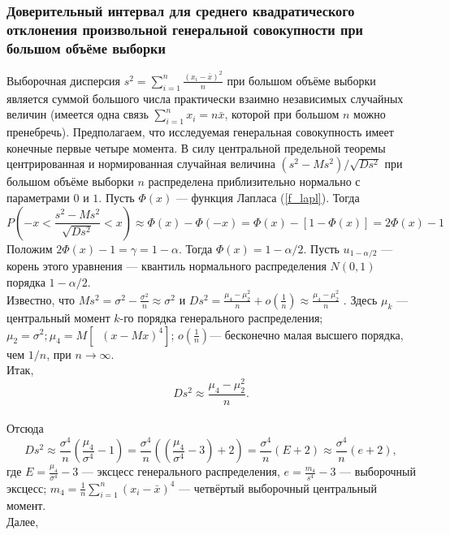 \documentclass[../body.tex]{subfiles}
\begin{document}
	\subsubsection{Доверительный интервал для среднего квадратического отклонения произвольной генеральной совокупности при большом объёме выборки}
	Выборочная дисперсия $s^{2} = \sum_{i = 1}^{n}{\frac{(x_{i} - \bar{x})^{2}}{n}}$ при большом объёме выборки является суммой большого числа практически взаимно независимых случайных величин (имеется одна связь $\sum_{i=1}^{n}{x_{i}} = n\bar{x}$, которой при большом $n$ можно пренебречь). Предполагаем, что исследуемая генеральная совокупность имеет конечные первые четыре момента.
	\newline
	В силу центральной предельной теоремы центрированная и нормированная случайная величина $(s^{2}-Ms^{2})/\sqrt{Ds^{2}}$ при большом объёме выборки $n$ распределена приблизительно нормально с параметрами $0$ и $1$. Пусть $\Phi(x)$ — функция Лапласа (\ref{f_lapl}). Тогда
	\begin{equation}
		P\left(-x < \frac{s^{2}-Ms^{2}}{\sqrt{Ds^{2}}} < x\right)
		\approx \Phi(x) - \Phi(-x)=\Phi(x) - [1 - \Phi(x)] = 2\Phi(x) - 1
		\label{P_as_sigma}
	\end{equation}
	Положим $2\Phi(x)-1 = \gamma = 1-\alpha$. Тогда $\Phi(x) = 1-\alpha/2$. Пусть $u_{1-\alpha/2}$ — корень этого уравнения — квантиль нормального распределения $N(0,1)$ порядка $1-\alpha/2$.\\ Известно, что $Ms^{2} = \sigma^{2} -\frac{\sigma^{2}}{n} \approx \sigma^{2} \text{ и } Ds^{2} = \frac{\mu_{4} -\mu_{2}^{2}}{n} + o(\frac{1}{n}) \approx \frac{\mu_{4} -\mu_{2}^{2}}{n}$ . Здесь $\mu_{k}$ — центральный момент $k$-го порядка генерального распределения; $\mu_{2} = \sigma^{2}; \mu_{4} = M[︀(x-Mx)^{4}]$︀; $o(\frac{1}{n})$︂— бесконечно малая высшего порядка, чем $1/n$, при $n\rightarrow \infty$. \\Итак, $$Ds^{2} \approx \frac{\mu_{4} -\mu_{2}^{2}}{n}.$$\\ Отсюда
	\begin{equation}
		Ds^{2} \approx \frac{\sigma^{4}}{n}(\frac{\mu_{4}}{\sigma^{4}} - 1) = 
		\frac{\sigma^{4}}{n}((\frac{\mu_{4}}{\sigma^{4}} - 3) + 2) = \frac{\sigma^{4}}{n}(E + 2) \approx \frac{\sigma^{4}}{n}(e + 2),
		\label{Ds_2}
	\end{equation}
	где $E = \frac{\mu_{4}}{\sigma^{4}} - 3$ — эксцесс генерального распределения, $e = \frac{m_{4}}{s^{4}} - 3$ — выборочный эксцесс; $m_{4} = \frac{1}{n}\sum_{i =1}^{n}{(x_{i} - \bar{x})^{4}}$  — четвёртый выборочный центральный момент.\\ Далее,
\end{document}
